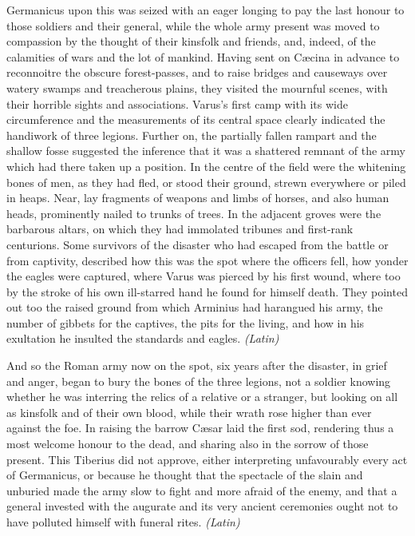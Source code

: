 
Germanicus upon this was seized with an eager longing to pay the last honour to those soldiers and their general, while the whole army present was moved to compassion by the thought of their kinsfolk and friends, and, indeed, of the calamities of wars and the lot of mankind. Having sent on Cæcina in advance to reconnoitre the obscure forest-passes, and to raise bridges and causeways over watery swamps and treacherous plains, they visited the mournful scenes, with their horrible sights and associations. Varus's first camp with its wide circumference and the measurements of its central space clearly indicated the handiwork of three legions. Further on, the partially fallen rampart and the shallow fosse suggested the inference that it was a shattered remnant of the army which had there taken up a position. In the centre of the field were the whitening bones of men, as they had fled, or stood their ground, strewn everywhere or piled in heaps. Near, lay fragments of weapons and limbs of horses, and also human heads, prominently nailed to trunks of trees. In the adjacent groves were the barbarous altars, on which they had immolated tribunes and first-rank centurions. Some survivors of the disaster who had escaped from the battle or from captivity, described how this was the spot where the officers fell, how yonder the eagles were captured, where Varus was pierced by his first wound, where too by the stroke of his own ill-starred hand he found for himself death. They pointed out too the raised ground from which Arminius had harangued his army, the number of gibbets for the captives, the pits for the living, and how in his exultation he insulted the standards and eagles. \emph{(Latin)}


And so the Roman army now on the spot, six years after the disaster, in grief and anger, began to bury the bones of the three legions, not a soldier knowing whether he was interring the relics of a relative or a stranger, but looking on all as kinsfolk and of their own blood, while their wrath rose higher than ever against the foe. In raising the barrow Cæsar laid the first sod, rendering thus a most welcome honour to the dead, and sharing also in the sorrow of those present. This Tiberius did not approve, either interpreting unfavourably every act of Germanicus, or because he thought that the spectacle of the slain and unburied made the army slow to fight and more afraid of the enemy, and that a general invested with the augurate and its very ancient ceremonies ought not to have polluted himself with funeral rites. \emph{(Latin)}

